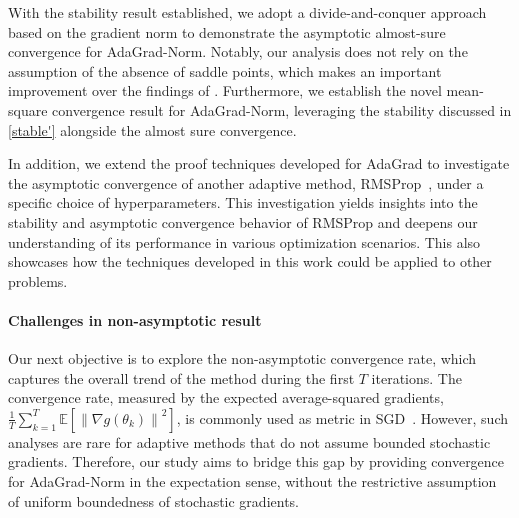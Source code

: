 \documentclass[standalone]{article}
\newcommand{\E}{\mathbb{E}}
\begin{document}


With the stability result established, we adopt a divide-and-conquer approach based on the gradient norm to demonstrate the asymptotic almost-sure convergence for AdaGrad-Norm. Notably, our analysis does not rely on the assumption of the absence of saddle points, which makes an important improvement over the findings of  \cite{jin2022convergence}. Furthermore, we establish the novel mean-square convergence result for AdaGrad-Norm, leveraging the stability discussed in \cref{stable'} alongside the almost sure convergence.  

In addition, we extend the proof techniques developed for AdaGrad to investigate the asymptotic convergence of another adaptive method, RMSProp~\citep{RMSProp}, under a specific choice of hyperparameters. This investigation yields insights into the stability and asymptotic convergence behavior of RMSProp and deepens our understanding of its performance in various optimization scenarios. This also showcases how the techniques developed in this work could be applied to other problems.

\paragraph{\textbf{Challenges in non-asymptotic result}} Our next objective is to explore the non-asymptotic convergence rate, which captures the overall trend of the method during the first $T$ iterations. 
The convergence rate, measured by the expected average-squared gradients, $\frac{1}{T}\sum_{k=1}^{T}\E[\left\|\nabla g(\theta_k) \right\|^2]$, is commonly used as metric in SGD~\citep{Ghadimi-2013,bottou2018optimization}. However, such analyses are rare for adaptive methods that do not assume bounded stochastic gradients. Therefore, our study aims to bridge this gap by providing convergence for AdaGrad-Norm in the expectation sense, without the restrictive assumption of uniform boundedness of stochastic gradients.
\end{document}
